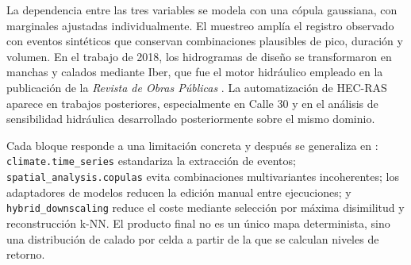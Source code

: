 La dependencia entre las tres variables se modela con una cópula gaussiana, con marginales ajustadas individualmente. El muestreo amplía el registro observado con eventos sintéticos que conservan combinaciones plausibles de pico, duración y volumen. En el trabajo de 2018, los hidrogramas de diseño se transformaron en manchas y calados mediante Iber, que fue el motor hidráulico empleado en la publicación de la \textit{Revista de Obras Públicas} \parencite{navas2018besaya}. La automatización de HEC-RAS aparece en trabajos posteriores, especialmente en Calle 30 y en el análisis de sensibilidad hidráulica desarrollado posteriormente sobre el mismo dominio.

Cada bloque responde a una limitación concreta y después se generaliza en \hydra: \texttt{climate.time\_series} estandariza la extracción de eventos; \texttt{spatial\_analysis.copulas} evita combinaciones multivariantes incoherentes; los adaptadores de modelos reducen la edición manual entre ejecuciones; y \texttt{hybrid\_downscaling} reduce el coste mediante selección por máxima disimilitud y reconstrucción k-NN. El producto final no es un único mapa determinista, sino una distribución de calado por celda a partir de la que se calculan niveles de retorno.

